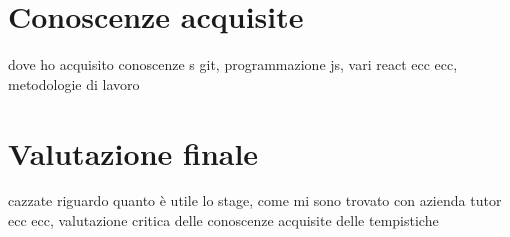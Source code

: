 \section{Conoscenze acquisite}
\label{sec:conoscenze-acquisite}
dove ho acquisito conoscenze s git, programmazione js, vari react ecc ecc, metodologie di lavoro

\section{Valutazione finale}
\label{sec:valutazione-finale}
cazzate riguardo quanto è utile lo stage, come mi sono trovato con azienda tutor ecc ecc, valutazione critica delle conoscenze acquisite delle tempistiche
